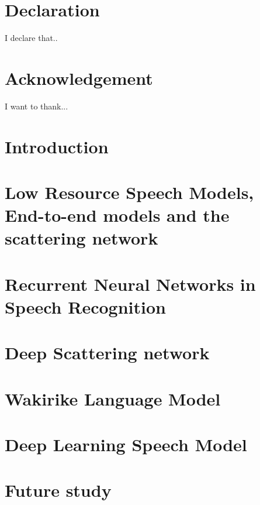 \documentclass[12pt,twoside]{report}
\begin{document}
\chapter*{Declaration}
I declare that..

\chapter*{Acknowledgement}
I want to thank...

\tableofcontents

\chapter{Introduction}


\chapter{Low Resource Speech Models, End-to-end models and the scattering network}\label{c02}


\chapter{Recurrent Neural Networks in Speech Recognition}\label{ch3RNN}


\chapter{Deep Scattering network}


\chapter{Wakirike Language Model}


\chapter{Deep Learning Speech Model}


\chapter{Future study}





\end{document}
